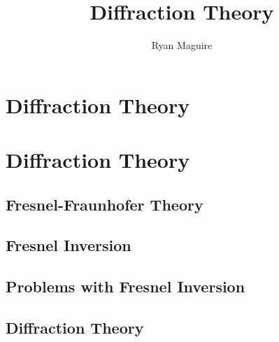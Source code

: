\documentclass[crop=false,class=book,oneside]{standalone}
\begin{document}
    \ifx\ifplanetdiff\undefined
        \newif\iffunct
        \title{Diffraction Theory}
        \author{Ryan Maguire}
        \date{\vspace{-5ex}}
        \maketitle
        \tableofcontents
        \clearpage
        \chapter*{Diffraction Theory}
        \setcounter{chapter}{4}
    \else
        \chapter{Diffraction Theory}
    \fi
    \section{Fresnel-Fraunhofer Theory}
    \section{Fresnel Inversion}
    \section{Problems with Fresnel Inversion}
    \section{Diffraction Theory}
\end{document}
